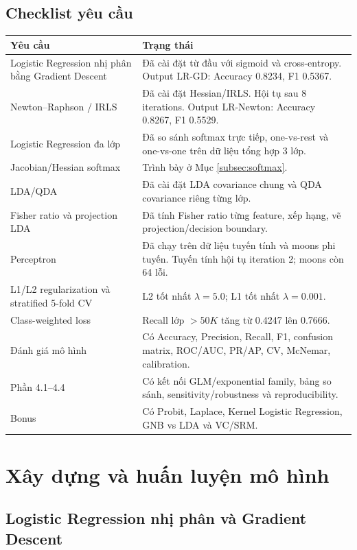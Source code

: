 \documentclass[12pt,a4paper]{article}
\begin{document}
\subsection{Checklist yêu cầu}

\begin{longtable}{P{0.42\textwidth}P{0.50\textwidth}}
\toprule
\textbf{Yêu cầu} & \textbf{Trạng thái} \\
\midrule
Logistic Regression nhị phân bằng Gradient Descent & Đã cài đặt từ đầu với sigmoid và cross-entropy. Output LR-GD: Accuracy 0.8234, F1 0.5367. \\
Newton--Raphson / IRLS & Đã cài đặt Hessian/IRLS. Hội tụ sau 8 iterations. Output LR-Newton: Accuracy 0.8267, F1 0.5529. \\
Logistic Regression đa lớp & Đã so sánh softmax trực tiếp, one-vs-rest và one-vs-one trên dữ liệu tổng hợp 3 lớp. \\
Jacobian/Hessian softmax & Trình bày ở Mục \ref{subsec:softmax}. \\
LDA/QDA & Đã cài đặt LDA covariance chung và QDA covariance riêng từng lớp. \\
Fisher ratio và projection LDA & Đã tính Fisher ratio từng feature, xếp hạng, vẽ projection/decision boundary. \\
Perceptron & Đã chạy trên dữ liệu tuyến tính và moons phi tuyến. Tuyến tính hội tụ iteration 2; moons còn 64 lỗi. \\
L1/L2 regularization và stratified 5-fold CV & L2 tốt nhất $\lambda=5.0$; L1 tốt nhất $\lambda=0.001$. \\
Class-weighted loss & Recall lớp $>50K$ tăng từ 0.4247 lên 0.7666. \\
Đánh giá mô hình & Có Accuracy, Precision, Recall, F1, confusion matrix, ROC/AUC, PR/AP, CV, McNemar, calibration. \\
Phần 4.1--4.4 & Có kết nối GLM/exponential family, bảng so sánh, sensitivity/robustness và reproducibility. \\
Bonus & Có Probit, Laplace, Kernel Logistic Regression, GNB vs LDA và VC/SRM. \\
\bottomrule
\end{longtable}

\section{Xây dựng và huấn luyện mô hình}

\subsection{Logistic Regression nhị phân và Gradient Descent}
\end{document}
